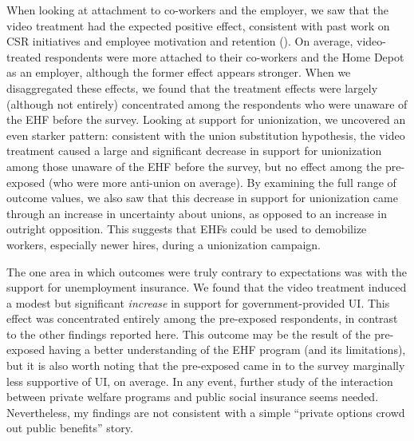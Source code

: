 \documentclass[
  11pt,
  oneside]{article}
\begin{document}
When looking at attachment to co-workers and the employer, we saw that the video treatment had the expected positive effect, consistent with past work on CSR initiatives and employee motivation and retention (). On average, video-treated respondents were more attached to their co-workers and the Home Depot as an employer, although the former effect appears stronger. When we disaggregated these effects, we found that the treatment effects were largely (although not entirely) concentrated among the respondents who were unaware of the EHF before the survey. Looking at support for unionization, we uncovered an even starker pattern: consistent with the union substitution hypothesis, the video treatment caused a large and significant decrease in support for unionization among those unaware of the EHF before the survey, but no effect among the pre-exposed (who were more anti-union on average). By examining the full range of outcome values, we also saw that this decrease in support for unionization came through an increase in uncertainty about unions, as opposed to an increase in outright opposition. This suggests that EHFs could be used to demobilize workers, especially newer hires, during a unionization campaign.

The one area in which outcomes were truly contrary to expectations was with the support for unemployment insurance. We found that the video treatment induced a modest but significant \emph{increase} in support for government-provided UI. This effect was concentrated entirely among the pre-exposed respondents, in contrast to the other findings reported here. This outcome may be the result of the pre-exposed having a better understanding of the EHF program (and its limitations), but it is also worth noting that the pre-exposed came in to the survey marginally less supportive of UI, on average. In any event, further study of the interaction between private welfare programs and public social insurance seems needed. Nevertheless, my findings are not consistent with a simple ``private options crowd out public benefits'' story.
\end{document}
